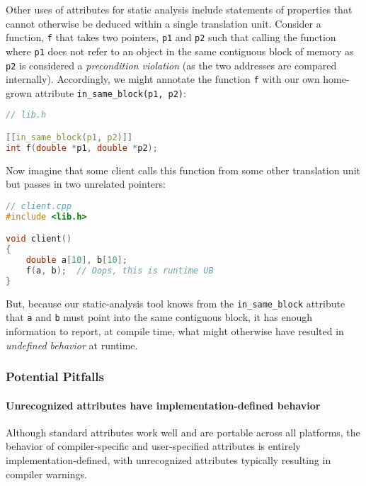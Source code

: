 \documentclass[twoside,10pt,letterpaper,usenames]{newstyle-PearsonGeneric-7-38}
\begin{document}
Other uses of attributes for static analysis include statements of
properties that cannot otherwise be deduced within a single translation
unit. Consider a function, \texttt{f} that takes two pointers,
\texttt{p1} and \texttt{p2} such that calling the function where
\texttt{p1} does not refer to an object in the same contiguous block of
memory as \texttt{p2} is considered a \emph{precondition violation} (as
the two addresses are compared internally). Accordingly, we might
annotate the function \texttt{f} with our own home-grown attribute
\texttt{in\_same\_block(p1,}~\texttt{p2)}:

\begin{lstlisting}[language=C++]
// lib.h

[[in_same_block(p1, p2)]]
int f(double *p1, double *p2);
\end{lstlisting}
    

Now imagine that some client calls this function from some other
translation unit but passes in two unrelated pointers:

\begin{lstlisting}[language=C++]
// client.cpp
#include <lib.h>

void client()
{
    double a[10], b[10];
    f(a, b);  // Oops, this is runtime UB
}
\end{lstlisting}
    

But, because our static-analysis tool knows from the
\texttt{in\_same\_block} attribute that \texttt{a} and \texttt{b} must
point into the same contiguous block, it has enough information to
report, at compile time, what might otherwise have resulted in
\emph{undefined behavior} at runtime.

\subsubsection[Potential Pitfalls]{Potential Pitfalls}\label{potential-pitfalls}

\paragraph[Unrecognized attributes have implementation-defined behavior]{Unrecognized attributes have implementation-defined behavior}\label{unrecognized-attributes-have-implementation-defined-behavior}

Although standard attributes work well and are portable across all
platforms, the behavior of compiler-specific and user-specified
attributes is entirely implementation-defined, with unrecognized
attributes typically resulting in compiler warnings.
\end{document}
